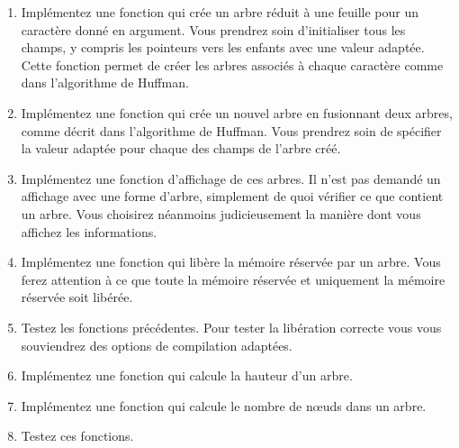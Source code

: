 \documentclass[a4paper, 10pt]{article}
\begin{document}
\begin{enumerate}
\item Implémentez une fonction  qui crée un arbre réduit à une feuille pour un caractère donné en argument. Vous prendrez soin d'initialiser tous les champs, y compris les pointeurs vers les enfants avec une valeur adaptée. Cette fonction permet de créer les arbres associés à chaque caractère comme dans l'algorithme de Huffman.
\item Implémentez une fonction  qui crée un nouvel arbre en fusionnant deux arbres, comme décrit dans l'algorithme de Huffman. Vous prendrez soin de spécifier la valeur adaptée pour chaque des champs de l'arbre créé.
\item Implémentez une fonction d'affichage de ces arbres. Il n'est pas demandé un affichage avec une forme d'arbre, simplement de quoi vérifier ce que contient un arbre. Vous choisirez néanmoins judicieusement la manière dont vous affichez les informations.
\item Implémentez une fonction  qui libère la mémoire réservée par un arbre. Vous ferez attention à ce que toute la mémoire réservée et uniquement la mémoire réservée soit libérée.
\item Testez les fonctions précédentes. Pour tester la libération correcte vous vous souviendrez des options de compilation adaptées.
\item Implémentez une fonction  qui calcule la hauteur d'un arbre.
\item Implémentez une fonction  qui calcule le nombre de nœuds dans un arbre.
\item Testez ces fonctions.
\end{enumerate}
\end{document}
